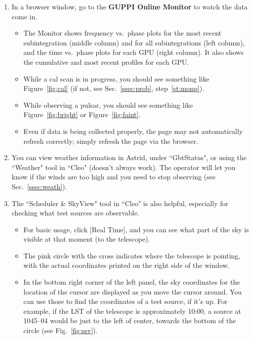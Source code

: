 \documentclass[11pt, reqno, tbtags]{article}
\begin{document}
\begin{enumerate}
 \item In a browser window, go to the \textbf{GUPPI Online Monitor} to watch the data come in.  
 \label{st:mon}\begin{itemize}
  \item The Monitor shows frequency vs.\ phase plots for the most recent subintegration (middle column) and for all subintegrations (left column), and the time vs.\ phase plots for each GPU (right column).  It also shows the cumulative and most recent profiles for each GPU.  
  \item While a cal scan is in progress, you should see something like Figure~\ref{fig:cal} (if not, see Sec.~\ref{ssec:prob}, step~\ref{st:monp}). 
  \item While observing a pulsar, you should see something like Figure~\ref{fig:bright} or Figure~\ref{fig:faint}. 
  \item Even if data is being collected properly, the page may not automatically refresh correctly; simply refresh the page via the browser.  \end{itemize}

 \item You can view weather information in Astrid, under ``GbtStatus", or using the ``Weather" tool in ``Cleo" (doesn't always work).  The operator will let you know if the winds are too high and you need to stop observing (see Sec.~\ref{ssec:weath}). 

 \item The ``Scheduler \& SkyView" tool in ``Cleo" is also helpful, especially for checking what test sources are observable.  \begin{itemize}
  \item For basic usage, click [Real Time], and you can see what part of the sky is visible at that moment (to the telescope).  
  \item The pink circle with the cross indicates where the telescope is pointing, with the actual coordinates printed on the right side of the window.  
  \item In the bottom right corner of the left panel, the sky coordinates for the location of the cursor are displayed as you move the cursor around.  You can use those to find the coordinates of a test source, if it's up.  For example, if the LST of the telescope is approximately 10:00, a source at 1045--04 would be just to the left of center, towards the bottom of the circle (see Fig.~\ref{fig:ssv}). \end{itemize}

\end{enumerate}
\end{document}
